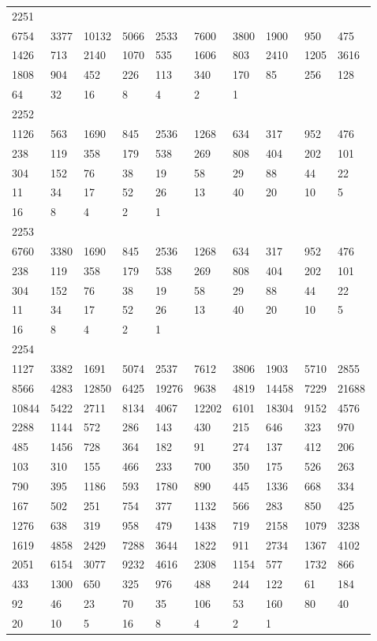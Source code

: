 \begin{longtable}{*{10}{l}}
2251&&&&&&&&&\\
6754& 3377& 10132& 5066& 2533& 7600& 3800& 1900& 950& 475\\
1426& 713& 2140& 1070& 535& 1606& 803& 2410& 1205& 3616\\
1808& 904& 452& 226& 113& 340& 170& 85& 256& 128\\
64& 32& 16& 8& 4& 2& 1& \\

2252&&&&&&&&&\\
1126& 563& 1690& 845& 2536& 1268& 634& 317& 952& 476\\
238& 119& 358& 179& 538& 269& 808& 404& 202& 101\\
304& 152& 76& 38& 19& 58& 29& 88& 44& 22\\
11& 34& 17& 52& 26& 13& 40& 20& 10& 5\\
16& 8& 4& 2& 1& \\

2253&&&&&&&&&\\
6760& 3380& 1690& 845& 2536& 1268& 634& 317& 952& 476\\
238& 119& 358& 179& 538& 269& 808& 404& 202& 101\\
304& 152& 76& 38& 19& 58& 29& 88& 44& 22\\
11& 34& 17& 52& 26& 13& 40& 20& 10& 5\\
16& 8& 4& 2& 1& \\

2254&&&&&&&&&\\
1127& 3382& 1691& 5074& 2537& 7612& 3806& 1903& 5710& 2855\\
8566& 4283& 12850& 6425& 19276& 9638& 4819& 14458& 7229& 21688\\
10844& 5422& 2711& 8134& 4067& 12202& 6101& 18304& 9152& 4576\\
2288& 1144& 572& 286& 143& 430& 215& 646& 323& 970\\
485& 1456& 728& 364& 182& 91& 274& 137& 412& 206\\
103& 310& 155& 466& 233& 700& 350& 175& 526& 263\\
790& 395& 1186& 593& 1780& 890& 445& 1336& 668& 334\\
167& 502& 251& 754& 377& 1132& 566& 283& 850& 425\\
1276& 638& 319& 958& 479& 1438& 719& 2158& 1079& 3238\\
1619& 4858& 2429& 7288& 3644& 1822& 911& 2734& 1367& 4102\\
2051& 6154& 3077& 9232& 4616& 2308& 1154& 577& 1732& 866\\
433& 1300& 650& 325& 976& 488& 244& 122& 61& 184\\
92& 46& 23& 70& 35& 106& 53& 160& 80& 40\\
20& 10& 5& 16& 8& 4& 2& 1& \\


\end{longtable}
